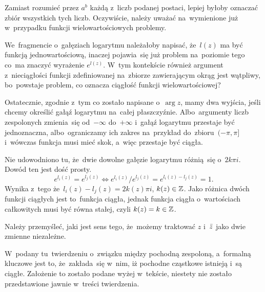 \documentclass[a4paper,11pt]{article}
\begin{document}
\vspace{\spaceFour}


\start {} Zamiast rozumieć przez $a^{ b }$ każdą z~liczb podanej
postaci, lepiej byłoby oznaczać zbiór wszystkich tych liczb.
Oczywiście, należy uważać na~wymienione już w~przypadku funkcji
wielowartościowych problemy.

\vspace{\spaceFour}


\start {} We~fragmencie o~gałęziach logarytmu należałoby
napisać, że~$l( z )$ ma być funkcją jednowartościową, inaczej
pojawia~się już problem na~poziomie tego co~ma znaczyć wyrażenie
$e^{ l( z ) }$. W~tym kontekście również argument z~nieciągłości
funkcji zdefiniowanej na~zbiorze zawierającym okrąg jest wątpliwy,
bo~powstaje problem, co oznacza ciągłość funkcji wielowartościowej?

Ostatecznie, zgodnie z~tym co zostało napisane o~$\arg z$, mamy dwa
wyjścia, jeśli chcemy określić gałąź logarytmu na~całej płaszczyźnie.
Albo~argumenty liczb zespolonych zmienia~się od~$-\infty$ do~$+\infty$
i~gałąź logarytmu przestaje być jednoznaczna, albo~ograniczamy ich
zakres na~przykład do~zbioru~$( -\pi, \pi ]$ i~wówczas funkcja musi
mieć skok, a~więc przestaje być ciągła.

\vspace{\spaceFour}


\start {} Nie udowodniono tu, że~dwie dowolne gałęzie logarytmu
różnią~się o~$2 k \pi i$. Dowód ten jest dość prosty.
\begin{equation}
  \label{eq:Leja-36}
  e^{ l_{ i }( z ) } = e^{ l_{ j }( z ) }
  \iff e^{ l_{ i }( z ) } / e^{ l_{ j }( z ) } = e^{ l_{ i }( z ) - l_{ j }( z ) }
  = 1.
\end{equation}
Wynika z~tego że~$l_{ i }( z ) - l_{ j }( z ) = 2 k( z ) \pi i$,
$k( z ) \in \mathbb{Z}$. Jako różnica dwóch funkcji ciągłych jest to~funkcja
ciągła, jednak funkcja ciągła o~wartościach całkowitych musi być równa
stałej, czyli $k( z ) = k \in \mathbb{Z}$.

\vspace{\spaceFour}


\start {} Należy przemyśleć, jaki jest sens tego, że~możemy
traktować $z$ i~$\bar{ z }$ jako dwie zmienne niezależne.

\vspace{\spaceFour}


\start {} W~podany tu~twierdzeniu o~związku między pochodną
zespoloną, a~formalną kluczowe jest to, że~zakłada~się w~nim, iż
pochodne cząstkowe istnieją i~są ciągłe. Założenie to zostało podane
wyżej w~tekście, niestety nie zostało przedstawione jawnie w~treści
twierdzenia.
\end{document}
